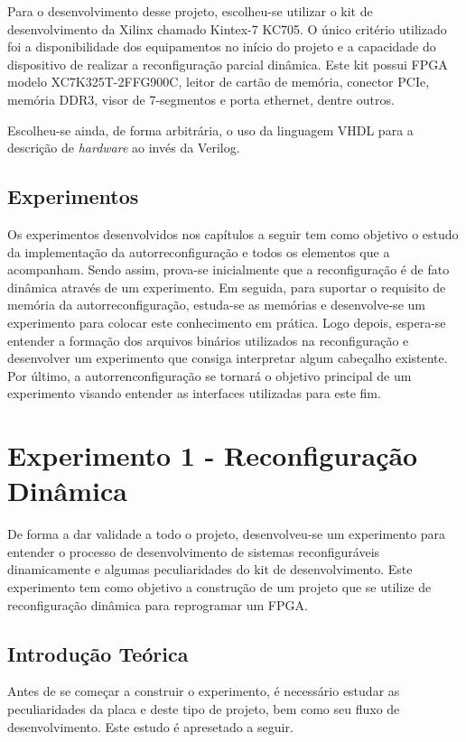 \documentclass[11pt,a4paper,oneside]{book}
\begin{document}
Para o desenvolvimento desse projeto, escolheu-se utilizar o kit de desenvolvimento da Xilinx\textregistered{} chamado Kintex-7 KC705.
O único critério utilizado foi a disponibilidade dos equipamentos no início do projeto e a capacidade do dispositivo de realizar a reconfiguração parcial dinâmica.
Este kit possui FPGA modelo XC7K325T-2FFG900C, leitor de cartão de memória, conector PCIe\textregistered{}, memória DDR3, visor de 7-segmentos e porta ethernet, dentre outros.

Escolheu-se ainda, de forma arbitrária, o uso da linguagem VHDL para a descrição de \textit{hardware} ao invés da Verilog.

\section{Experimentos}
Os experimentos desenvolvidos nos capítulos a seguir tem como objetivo o estudo da implementação da autorreconfiguração e todos os elementos que a acompanham.
Sendo assim, prova-se inicialmente que a reconfiguração é de fato dinâmica através de um experimento.
Em seguida, para suportar o requisito de memória da autorreconfiguração, estuda-se as memórias e desenvolve-se um experimento para colocar este conhecimento em prática.
Logo depois, espera-se entender a formação dos arquivos binários utilizados na reconfiguração e desenvolver um experimento que consiga interpretar algum cabeçalho existente.
Por último, a autorrenconfiguração se tornará o objetivo principal de um experimento visando entender as interfaces utilizadas para este fim. 


\chapter{Experimento 1 - Reconfiguração Dinâmica}
De forma a dar validade a todo o projeto, desenvolveu-se um experimento para entender o processo de desenvolvimento de sistemas reconfiguráveis dinamicamente e algumas peculiaridades do kit de desenvolvimento.
Este experimento tem como objetivo a construção de um projeto que se utilize de reconfiguração dinâmica para reprogramar um FPGA.

\section{Introdução Teórica}
Antes de se começar a construir o experimento, é necessário estudar as peculiaridades da placa e deste tipo de projeto, bem como seu fluxo de desenvolvimento.
Este estudo é apresetado a seguir.
\end{document}
